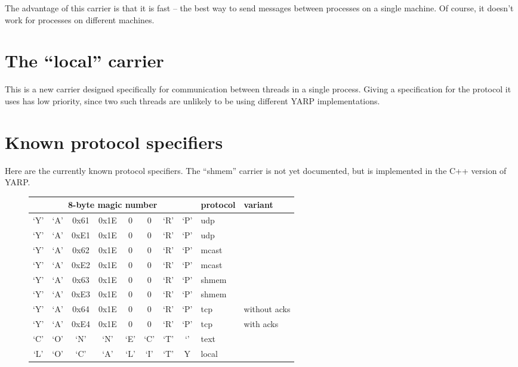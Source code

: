 The advantage of this carrier is that it is fast -- the best way to
send messages between processes on a single machine.  Of course, it
doesn't work for processes on different machines.


\section{The ``local'' carrier}

This is a new carrier designed specifically for communication between
threads in a single process.  Giving a specification for the protocol
it uses has low priority, since two such threads are unlikely to be
using different YARP implementations.


\section{Known protocol specifiers}

Here are the currently known protocol specifiers.
The ``shmem'' carrier is not yet documented, but is
implemented in the C++ version of YARP.

\begin{figure}[h]
\begin{tabular}{|cccccccc|l|l|}
\hline
\multicolumn{8}{|c|}{\bf 8-byte magic number} & {\bf protocol} & {\bf variant} \\ \hline\hline
`Y' & `A' & 0x61 & 0x1E & 0 & 0 & `R' & `P'  & udp & \\
`Y' & `A' & 0xE1 & 0x1E & 0 & 0 & `R' & `P'  & udp & \\
`Y' & `A' & 0x62 & 0x1E & 0 & 0 & `R' & `P'  & mcast & \\
`Y' & `A' & 0xE2 & 0x1E & 0 & 0 & `R' & `P'  & mcast & \\
`Y' & `A' & 0x63 & 0x1E & 0 & 0 & `R' & `P'  & shmem & \\
`Y' & `A' & 0xE3 & 0x1E & 0 & 0 & `R' & `P'  & shmem & \\
`Y' & `A' & 0x64 & 0x1E & 0 & 0 & `R' & `P'  & tcp & without acks \\
`Y' & `A' & 0xE4 & 0x1E & 0 & 0 & `R' & `P'  & tcp & with acks \\
`C' & `O' & `N'  & `N'  & `E' & `C' & `T' & `\textvisiblespace{}'  & text & \\
`L' & `O' & `C'  & `A'  & `L' & `I' & `T' & Y  & local & \\
\hline
\end{tabular}
\end{figure}
